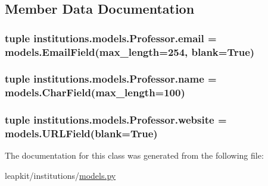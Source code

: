 \subsection{Member Data Documentation}
\hypertarget{classinstitutions_1_1models_1_1_professor_a9452e09c5fdc2ad59ff291b6ba884486}{
\subsubsection[{email}]{\setlength{\rightskip}{0pt plus 5cm}tuple institutions.\-models.\-Professor.\-email = models.\-Email\-Field(max\-\_\-length=254, blank=True)\hspace{0.3cm}{\ttfamily [static]}}}\label{classinstitutions_1_1models_1_1_professor_a9452e09c5fdc2ad59ff291b6ba884486}
\hypertarget{classinstitutions_1_1models_1_1_professor_a0f03c8cdf4c8a603a405297c94a59914}{
\subsubsection[{name}]{\setlength{\rightskip}{0pt plus 5cm}tuple institutions.\-models.\-Professor.\-name = models.\-Char\-Field(max\-\_\-length=100)\hspace{0.3cm}{\ttfamily [static]}}}\label{classinstitutions_1_1models_1_1_professor_a0f03c8cdf4c8a603a405297c94a59914}
\hypertarget{classinstitutions_1_1models_1_1_professor_aedcc93c03e5245d88ac7592721bd4431}{
\subsubsection[{website}]{\setlength{\rightskip}{0pt plus 5cm}tuple institutions.\-models.\-Professor.\-website = models.\-U\-R\-L\-Field(blank=True)\hspace{0.3cm}{\ttfamily [static]}}}\label{classinstitutions_1_1models_1_1_professor_aedcc93c03e5245d88ac7592721bd4431}


The documentation for this class was generated from the following file\-:\begin{DoxyCompactItemize}
\item 
leapkit/institutions/\hyperlink{institutions_2models_8py}{models.\-py}\end{DoxyCompactItemize}

